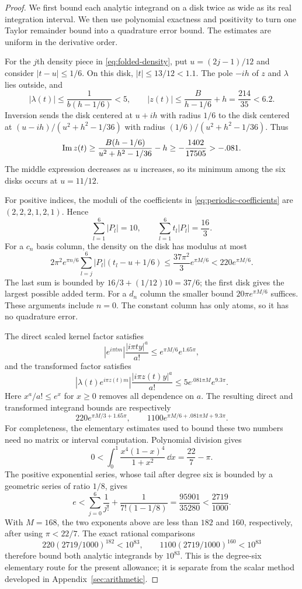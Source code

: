 \begin{proof}
We first bound each analytic integrand on a disk twice as wide as its real
integration interval.  We then use polynomial exactness and positivity to
turn one Taylor remainder bound into a quadrature error bound.  The estimates
are uniform in the derivative order.

For the $j$th density piece in \eqref{eq:folded-density}, put
$u=(2j-1)/12$ and consider $|t-u|\le1/6$.  On this disk,
$|t|\le13/12<1.1$.  The pole $-ih$ of $z$ and $\lambda$ lies outside, and
\[
 |\lambda(t)|\le\frac1{b(h-1/6)}<5,
 \qquad
 |z(t)|\le\frac{B}{h-1/6}+h=\frac{214}{35}<6.2.
\]
Inversion sends the disk centered at $u+ih$ with radius $1/6$ to the disk
centered at $(u-ih)/(u^2+h^2-1/36)$ with radius
$(1/6)/(u^2+h^2-1/36)$.  Thus
\begin{equation}\label{eq:complex-kernel-disk}
 \operatorname{Im} z(t)\ge
 \frac{B(h-1/6)}{u^2+h^2-1/36}-h
 \ge-\frac{1402}{17505}>-.081.
\end{equation}
The middle expression decreases as $u$ increases, so its minimum among the
six disks occurs at $u=11/12$.

For positive indices, the moduli of the coefficients in
\eqref{eq:periodic-coefficients} are $(2,2,2,1,2,1)$.  Hence
\[
 \sum_{l=1}^6|P_l|=10,\qquad
 \sum_{l=1}^6t_l|P_l|=\frac{16}{3}.
\]
For a $c_n$ basis column, the density on the disk has modulus at most
\[
 2\pi^2e^{\pi n/6}\sum_{l=j}^6|P_l|(t_l-u+1/6)
 \le\frac{37\pi^2}{3}e^{\pi M/6}<220e^{\pi M/6}.
\]
The last sum is bounded by $16/3+(1/12)10=37/6$; the first disk gives the
largest possible added term.  For a $d_n$ column the smaller bound
$20\pi e^{\pi M/6}$ suffices.  These arguments include $n=0$.
The constant column has only atoms, so it has no quadrature error.

The direct scaled kernel factor satisfies
\[
 |e^{i\pi tm}|\frac{|i\pi ty|^a}{a!}
 \le e^{\pi M/6}e^{1.65\pi},
\]
and the transformed factor satisfies
\[
 |\lambda(t)e^{i\pi z(t)m}|\frac{|i\pi z(t)y|^a}{a!}
 \le5e^{.081\pi M}e^{9.3\pi}.
\]
Here $x^a/a!\le e^x$ for $x\ge0$ removes all dependence on $a$.
The resulting direct and transformed integrand bounds are respectively
\[
 220e^{\pi M/3+1.65\pi},\qquad
 1100e^{\pi M/6+.081\pi M+9.3\pi}.
\]
For completeness, the elementary estimates used to bound these two numbers
need no matrix or interval computation.  Polynomial division gives
\[
 0<\int_0^1\frac{x^4(1-x)^4}{1+x^2}\,\dd x=\frac{22}{7}-\pi.
\]
The positive exponential series, whose tail after degree six is bounded by
a geometric series of ratio $1/8$, gives
\[
 e<\sum_{j=0}^6\frac1{j!}+\frac1{7!(1-1/8)}
   =\frac{95901}{35280}<\frac{2719}{1000}.
\]
With $M=168$, the two exponents above are less than $182$ and $160$,
respectively, after using $\pi<22/7$.  The exact rational comparisons
\[
 220(2719/1000)^{182}<10^{83},\qquad
 1100(2719/1000)^{160}<10^{83}
\]
therefore bound both analytic integrands by $10^{83}$.  This is the
degree-six elementary route for the present allowance; it is separate from
the scalar method developed in Appendix~\ref{sec:arithmetic}.


\end{proof}
